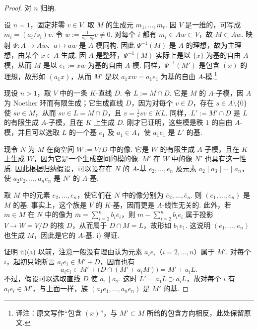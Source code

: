\begin{proof}
对 $n$ 归纳.

设 $n=1$，固定非零 $v\in V$. 取 $M$ 的生成元 $m_1,\ldots,m_r$. 因 $V$ 是一维的，可写成 $m_i=(a_i/s_i)v$. 令 $w:=\frac1{s_1\cdots s_r}v\ne0$. 对每个 $i$ 都有 $m_i\in Aw\subset V$，故 $M\subset Aw$. 映射 $\Psi\colon A\longrightarrow Aw$、$a\mapsto aw$ 是 $A$-模同构. 因此 $\Psi^{-1}(M)$ 是 $A$ 的理想，故为主理想，由某个 $x\in A$ 生成. 因 $A$ 是整环，$\Psi^{-1}(M)$ 实际上是以 $\{x\}$ 为基的自由 $A$-模，从而 $M$ 是以 $e_1:=xw$ 为基的自由 $A$-模. 同样，$\Psi^{-1}(M')$ 是包含 $(x)$ 的理想，故形如 $(a_1x)$，从而 $M'$ 是以 $a_1xw=a_1e_1$ 为基的自由 $A$-模.\footnote{译注：原文写作``包含 $(x)$''，与 $M'\subset M$ 所给的包含方向相反，此处保留原文.}

现设 $n>1$，取 $V$ 中的一条 $K$-直线 $D$. 令 $L:=M\cap D$. 它是 $M$ 的 $A$-子模，因 $A$ 为 Noether 环而有限生成；它生成直线 $D$，因为对每个 $v\in D$，存在 $s\in A\setminus\{0\}$ 使 $sv\in M$，从而 $sv\in L=M\cap D$，且 $v=\frac1s sv\in KL$. 同样，$L':=M'\cap D$ 是 $L$ 的有限生成 $A$-子模，且在 $K$ 上生成 $D$. 刚才已证明，这些模是秩 $1$ 的自由 $A$-模，并且可以选取 $L$ 的一个基 $e_1$ 及 $a_1\in A$，使 $a_1e_1$ 是 $L'$ 的基.

现令 $N$ 为 $M$ 在商空间 $W:=V/D$ 中的像. 它是 $W$ 的有限生成 $A$-子模，且在 $K$ 上生成 $W$，因为它是一个生成空间的模的像. $M'$ 在 $W$ 中的像 $N'$ 也具有这一性质. 因此根据归纳假设，可以设存在 $N$ 的 $A$-基 $\overline e_2,\ldots,\overline e_n$ 及元素 $a_2\mid a_3\mid\cdots\mid a_n$，使 $a_2\overline e_2,\ldots,a_n\overline e_n$ 是 $N'$ 的 $A$-基.

取 $M$ 中的元素 $e_2,\ldots,e_n$，使它们在 $N$ 中的像分别为 $\overline e_2,\ldots,\overline e_n$. 则 $(e_1,\ldots,e_n)$ 是 $M$ 的基. 事实上，这个族是 $V$ 的 $K$-基，因而更是 $A$-线性无关的. 此外，若 $m\in M$ 在 $N$ 中的像为 $\overline m=\sum_{i=2}^n b_i\overline e_i$，则 $m-\sum_{i=2}^n b_ie_i$ 属于投影 $V\longrightarrow W=V/D$ 的核 $D$，从而属于 $D\cap M=L$，故形如 $b_1e_1$. 这说明 $(e_1,\ldots,e_n)$ 也生成 $M$，因此是它的 $A$-基. i) 得证.

证明 ii)(a) 以前，注意一般没有理由认为元素 $a_ie_i$（$i=2,\ldots,n$）属于 $M'$. 对每个 $i$，起初只能断言 $a_ie_i\in M'+D$，因而也有
\[a_ie_i\in M'+\bigl(D\cap(M'+a_iM)\bigr)=M'+a_iL.\]
不过，假设可以选取直线 $D$ 使 $a_1\mid a_2$. 这时 $L'=a_1L\supset a_iL$，故对每个 $i$ 有 $a_ie_i\in M'$，与上面一样，族 $(a_1e_1,\ldots,a_ne_n)$ 是 $M'$ 的基.


\end{proof}
